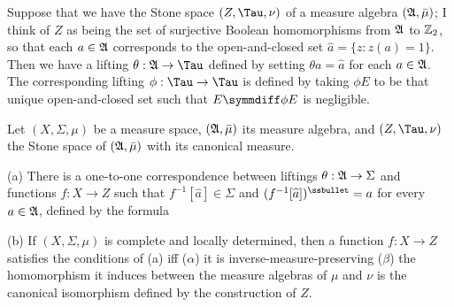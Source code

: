    Suppose that we have the Stone space $(Z,\Tau,\nu)$ of a
measure algebra $(\frak A,\bar\mu)$;   I think of
$Z$ as being the set of surjective Boolean homomorphisms from $\frak A$
to $\Bbb Z_2$, so that each $a\in\frak A$ corresponds to the
open-and-closed set $\widehat{a}=\{z:z(a)=1\}$.   Then we have a lifting
$\theta:\frak A\to\Tau$ defined by setting $\theta a=\widehat{a}$ for
each $a\in\frak A$.      The
corresponding
lifting $\phi:\Tau\to\Tau$ is defined by taking $\phi E$ to be that
unique open-and-closed set such that $E\symmdiff\phi E$ is
negligible.


 Let
$(X,\Sigma,\mu)$ be a measure space, $(\frak A,\bar\mu)$ its measure
algebra, and $(Z,\Tau,\nu)$ the Stone space of $(\frak A,\bar\mu)$ with
its canonical measure.

(a) There is a one-to-one correspondence between liftings
$\theta:\frak A\to\Sigma$ and functions $f:X\to Z$ such that
$f^{-1}[\widehat{a}]\in\Sigma$
and $(f^{-1}[\widehat{a}])^{\ssbullet}=a$ for every $a\in\frak A$,
defined by the formula


(b) If $(X,\Sigma,\mu)$ is complete and locally determined, then a
function $f:X\to Z$ satisfies the conditions of (a) iff ($\alpha$) it is
inverse-measure-preserving ($\beta$) the homomorphism it induces between
the measure algebras of $\mu$ and $\nu$ is the canonical
isomorphism defined by the construction of $Z$.

